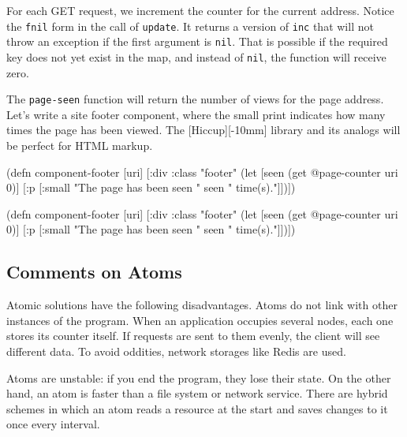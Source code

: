\fi


For each GET request, we increment the counter for the current address.
Notice the \verb|fnil| form in the call of \verb|update|. It returns a version of \verb|inc| that will not throw an exception if the first argument is \verb|nil|.
That is possible if the required key does not yet exist in the map, and instead of \verb|nil|, the function will receive zero.


The \verb|page-seen| function will return the number of views for the page address.
Let's write a site footer component, where the small print indicates how many times the page has been viewed. The [Hiccup][-10mm] library and its analogs will be perfect for HTML markup.

\ifx\DEVICETYPE\MOBILE

\begin{clojure}
(defn component-footer [uri]
  [:div {:class "footer"}
   (let [seen (get @page-counter uri 0)]
     [:p [:small
          "The page has been seen " seen
          " time(s)."]])])
\end{clojure}

\else

\begin{clojure}
(defn component-footer [uri]
  [:div {:class "footer"}
   (let [seen (get @page-counter uri 0)]
     [:p [:small "The page has been seen " seen " time(s)."]])])
\end{clojure}

\fi

\subsection{Comments on Atoms}

Atomic solutions have the following disadvantages.
Atoms do not link with other instances of the program. When an application occupies several nodes, each one stores its counter itself.
If requests are sent to them evenly, the client will see different data.
To avoid oddities, network storages like Redis are used.


Atoms are unstable: if you end the program, they lose their state.
On the other hand, an atom is faster than a file system or network service.
There are hybrid schemes in which an atom reads a resource at the start and saves changes to it once every interval.

